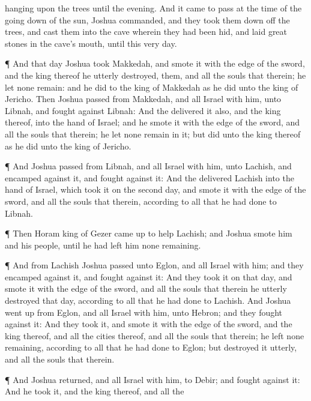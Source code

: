 {hanging upon the
trees until the
evening.
And it came to pass at the
time of the going
down of the
sun,
{}
Joshua
commanded, and they took them
down off the
trees, and
cast them into the
cave wherein they had been
hid, and
laid
great
stones in the
cave’s
mouth,
{} until this
very
day.
\par }{\PP {}¶ And that
day
Joshua
took
Makkedah, and
smote it with the
edge of the
sword, and the
king thereof he utterly
destroyed, them, and all the
souls that
{} therein; he
let none
remain: and he
did to the
king of
Makkedah as he
did unto the
king of
Jericho.
Then
Joshua
passed from
Makkedah, and all
Israel with him, unto
Libnah, and
fought against
Libnah:
And the
{}
delivered it also, and the
king thereof, into the
hand of
Israel; and he
smote it with the
edge of the
sword, and all the
souls that
{} therein; he
let none
remain in it; but
did unto the
king thereof as he
did unto the
king of
Jericho.
\par }{\PP {}¶ And
Joshua
passed from
Libnah, and all
Israel with him, unto
Lachish, and
encamped against it, and
fought against it:
And the
{}
delivered
Lachish into the
hand of
Israel, which
took it on the
second
day, and
smote it with the
edge of the
sword, and all the
souls that
{} therein, according to all that he had
done to
Libnah.
\par }{\PP {}¶ Then
Horam
king of
Gezer came
up to
help
Lachish; and
Joshua
smote him and his
people, until he had
left him none
remaining.
\par }{\PP {}¶ And from
Lachish
Joshua
passed unto
Eglon, and all
Israel with him; and they
encamped against it, and
fought against it:
And they
took it on that
day, and
smote it with the
edge of the
sword, and all the
souls that
{} therein he utterly
destroyed that
day, according to all that he had
done to
Lachish.
And
Joshua went
up from
Eglon, and all
Israel with him, unto
Hebron; and they
fought against it:
And they
took it, and
smote it with the
edge of the
sword, and the
king thereof, and all the
cities thereof, and all the
souls that
{} therein; he
left none
remaining, according to all that he had
done to
Eglon; but
destroyed it utterly, and all the
souls that
{} therein.
\par }{\PP {}¶ And
Joshua
returned, and all
Israel with him, to
Debir; and
fought against it:
And he
took it, and the
king thereof, and all the
}
